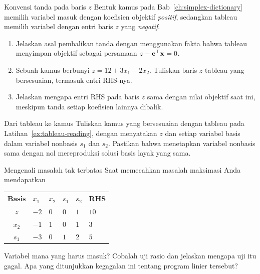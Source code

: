 
\begin{ex}{Konvensi tanda pada baris $z$}{}
\label{ex:tableau-sign-convention}
 Bentuk kamus pada Bab~\ref{ch:simplex-dictionary} memilih variabel
masuk dengan koefisien objektif \emph{positif}, sedangkan tableau memilih
variabel dengan entri baris $z$ yang \emph{negatif}.
\begin{enumerate}
\item Jelaskan asal pembalikan tanda dengan menggunakan fakta bahwa tableau menyimpan objektif sebagai persamaan $z - \mathbf{c}^\top\mathbf{x} = 0$.
\item Sebuah kamus berbunyi $z = 12 + 3x_1 - 2x_2$. Tuliskan baris $z$ tableau yang bersesuaian, termasuk entri RHS-nya.
\item Jelaskan mengapa entri RHS pada baris $z$ sama dengan nilai objektif saat ini, meskipun tanda setiap koefisien lainnya dibalik.
\end{enumerate}
\end{ex}

\begin{ex}{Dari tableau ke kamus}{}
\label{ex:tableau-to-dictionary}
 Tuliskan kamus yang bersesuaian dengan tableau pada
Latihan~\ref{ex:tableau-reading}, dengan menyatakan $z$ dan setiap variabel
basis dalam variabel nonbasis $s_1$ dan $s_2$. Pastikan bahwa menetapkan
variabel nonbasis sama dengan nol mereproduksi solusi basis layak yang sama.
\end{ex}

\begin{ex}{Mengenali masalah tak terbatas}{}
\label{ex:tableau-unbounded}
 Saat memecahkan masalah maksimasi Anda mendapatkan
\begin{center}
\renewcommand{\arraystretch}{1.3}
\begin{tabular}{c|ZZZZ|Z}
\toprule
Basis & $x_1$ & $x_2$ & $s_1$ & $s_2$ & RHS\\
\midrule
$z$   & $-2$ & $0$ & $0$ & $1$ & $10$\\
\midrule
$x_2$ & $-1$ & $1$ & $0$ & $1$ & $3$\\
$s_1$ & $-3$ & $0$ & $1$ & $2$ & $5$\\
\bottomrule
\end{tabular}
\end{center}
Variabel mana yang harus masuk? Cobalah uji rasio dan jelaskan mengapa uji itu
gagal. Apa yang ditunjukkan kegagalan ini tentang program linier tersebut?
\end{ex}

